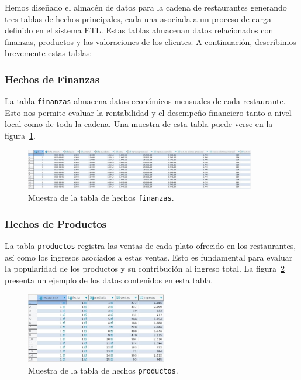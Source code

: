 \documentclass[11pt]{opticajnl}
\begin{document}
Hemos diseñado el almacén de datos para la cadena de restaurantes generando tres tablas de hechos principales, cada una asociada a un proceso de carga definido en el sistema ETL. Estas tablas almacenan datos relacionados con finanzas, productos y las valoraciones de los clientes. A continuación, describimos brevemente estas tablas:

\subsubsection{Hechos de Finanzas}

La tabla \texttt{finanzas} almacena datos económicos mensuales de cada restaurante. Esto nos permite evaluar la rentabilidad y el desempeño financiero tanto a nivel local como de toda la cadena. Una muestra de esta tabla puede verse en la figura~\ref{fig:tablahechos1}.

\begin{figure}[h]
    \centering
    \includegraphics[width=0.9\textwidth]{fotos/etl_tabla_transitoria.jpg}
    \caption{Muestra de la tabla de hechos \texttt{finanzas}.}
    \label{fig:tablahechos1}
\end{figure}

\subsubsection{Hechos de Productos}

La tabla \texttt{productos} registra las ventas de cada plato ofrecido en los restaurantes, así como los ingresos asociados a estas ventas. Esto es fundamental para evaluar la popularidad de los productos y su contribución al ingreso total. La figura~\ref{fig:tablahechos2} presenta un ejemplo de los datos contenidos en esta tabla.

\begin{figure}[h]
    \centering
    \includegraphics[width=0.55\textwidth]{fotos/fact_ventas.jpg}
    \caption{Muestra de la tabla de hechos \texttt{productos}.}
    \label{fig:tablahechos2}
\end{figure}
\newpage
\end{document}
